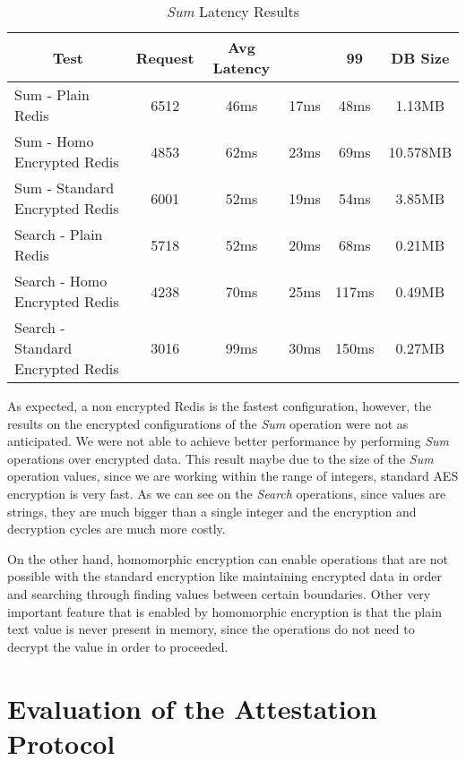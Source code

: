 \begin{table}[ht]
	\caption{\textit{Sum} Latency Results}
	\label{tab:sum_latency_results}
\centering
\begin{tabular}{lccccc}
	\toprule
	\multicolumn{1}{c}{\textbf{Test}} & \pmb{\#}\textbf{Request} & \textbf{Avg Latency} & \pmb{\ensuremath{\sigma}} & \textbf{99}\pmb{\%} & \textbf{DB Size} \\
	\midrule
		Sum - Plain Redis & 6512 & 46ms & 17ms & 48ms & 1.13MB  					\\
		Sum - Homo Encrypted Redis & 4853 & 62ms & 23ms & 69ms & 10.578MB  		\\
		Sum - Standard Encrypted Redis & 6001 & 52ms & 19ms & 54ms & 3.85MB  	\\
		Search - Plain Redis & 5718 & 52ms & 20ms & 68ms & 0.21MB				\\
		Search - Homo Encrypted Redis & 4238	 & 70ms & 25ms & 117ms & 0.49MB		\\
		Search - Standard Encrypted Redis & 3016	 & 99ms & 30ms & 150ms & 0.27MB	\\
	\bottomrule
\end{tabular}
\end{table}

As expected, a non encrypted Redis is the fastest configuration, however, the results on the encrypted configurations of the \textit{Sum} operation were not as anticipated. We were not able to achieve better performance by performing \textit{Sum} operations over encrypted data. This result maybe due to the size of the \textit{Sum} operation values, since we are working within the range of integers, standard \gls{AES} encryption is very fast. As we can see on the \textit{Search} operations, since values are strings, they are much bigger than a single integer and the encryption and decryption cycles are much more costly.

On the other hand, homomorphic encryption can enable operations that are not possible with the standard encryption like maintaining encrypted data in order and searching through finding values between certain boundaries. Other very important feature that is enabled by homomorphic encryption is that the plain text value is never present in memory, since the operations do not need to decrypt the value in order to proceeded.

\section{Evaluation of the Attestation Protocol}
\label{sec:evaluation_attestation_protocol}


